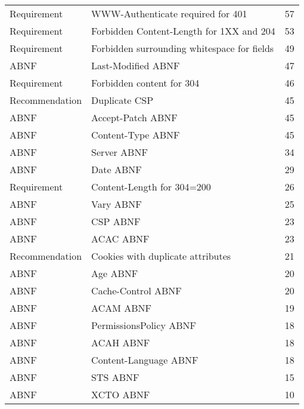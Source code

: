 \begin{tabular}{llr}
   Requirement &           WWW-Authenticate required for 401 &       57 \\
   Requirement &    Forbidden Content-Length for 1XX and 204 &       53 \\
   Requirement & Forbidden surrounding whitespace for fields &       49 \\
          ABNF &                          Last-Modified ABNF &       47 \\
   Requirement &                   Forbidden content for 304 &       46 \\
Recommendation &                               Duplicate CSP &       45 \\
          ABNF &                           Accept-Patch ABNF &       45 \\
          ABNF &                           Content-Type ABNF &       45 \\
          ABNF &                                 Server ABNF &       34 \\
          ABNF &                                   Date ABNF &       29 \\
   Requirement &                  Content-Length for 304=200 &       26 \\
          ABNF &                                   Vary ABNF &       25 \\
          ABNF &                                    CSP ABNF &       23 \\
          ABNF &                                   ACAC ABNF &       23 \\
Recommendation &           Cookies with duplicate attributes &       21 \\
          ABNF &                                    Age ABNF &       20 \\
          ABNF &                          Cache-Control ABNF &       20 \\
          ABNF &                                   ACAM ABNF &       19 \\
          ABNF &                      PermissionsPolicy ABNF &       18 \\
          ABNF &                                   ACAH ABNF &       18 \\
          ABNF &                       Content-Language ABNF &       18 \\
          ABNF &                                    STS ABNF &       15 \\
          ABNF &                                   XCTO ABNF &       10 \\

\end{tabular}
